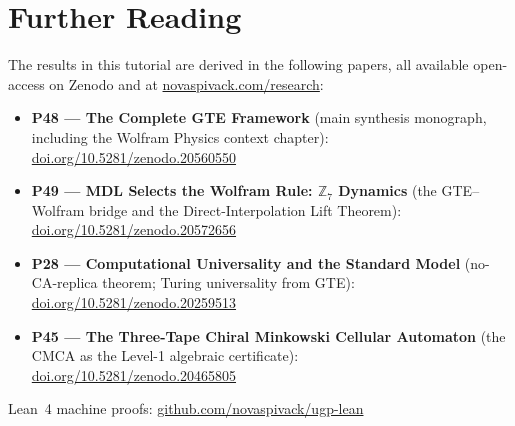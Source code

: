 \documentclass[11pt,a4paper]{article}
\begin{document}
\section*{Further Reading}
\begin{tcolorbox}[colback=orange!8,colframe=orange!50!black,
  title=\textbf{Primary Sources}]
The results in this tutorial are derived in the following papers,
all available open-access on Zenodo and at
\href{https://novaspivack.com/research}{novaspivack.com/research}:
\begin{itemize}[itemsep=2pt]
  \item \textbf{P48 --- The Complete GTE Framework} (main synthesis monograph,
    including the Wolfram Physics context chapter):\\
        \href{https://doi.org/10.5281/zenodo.20560550}{doi.org/10.5281/zenodo.20560550}
  \item \textbf{P49 --- MDL Selects the Wolfram Rule: $\mathbb{Z}_7$ Dynamics}
        (the GTE--Wolfram bridge and the Direct-Interpolation Lift Theorem):\\
        \href{https://doi.org/10.5281/zenodo.20572656}{doi.org/10.5281/zenodo.20572656}
  \item \textbf{P28 --- Computational Universality and the Standard Model}
        (no-CA-replica theorem; Turing universality from GTE):\\
        \href{https://doi.org/10.5281/zenodo.20259513}{doi.org/10.5281/zenodo.20259513}
  \item \textbf{P45 --- The Three-Tape Chiral Minkowski Cellular Automaton}
        (the CMCA as the Level-1 algebraic certificate):\\
        \href{https://doi.org/10.5281/zenodo.20465805}{doi.org/10.5281/zenodo.20465805}
\end{itemize}
Lean~4 machine proofs:
\href{https://github.com/novaspivack/ugp-lean}{github.com/novaspivack/ugp-lean}
\end{tcolorbox}


\end{document}
